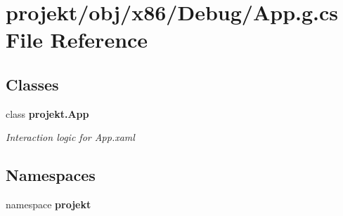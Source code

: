 \section{projekt/obj/x86/\+Debug/\+App.g.\+cs File Reference}
\label{x86_2Debug_2App_8g_8cs}
\subsection*{Classes}
\begin{DoxyCompactItemize}
\item 
class \textbf{ projekt.\+App}
\begin{DoxyCompactList}\small\item\em Interaction logic for App.\+xaml \end{DoxyCompactList}\end{DoxyCompactItemize}
\subsection*{Namespaces}
\begin{DoxyCompactItemize}
\item 
namespace \textbf{ projekt}
\end{DoxyCompactItemize}
